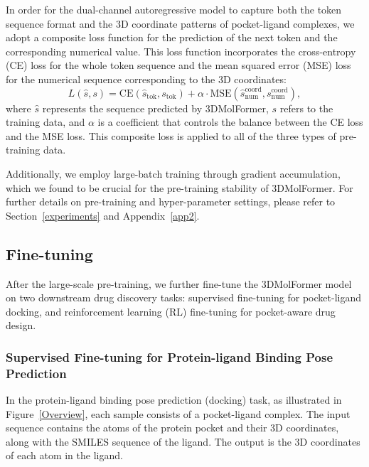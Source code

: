 In order for the dual-channel autoregressive model to capture both the token sequence format and the 3D coordinate patterns of pocket-ligand complexes, we adopt a composite loss function for the prediction of the next token and the corresponding numerical value. This loss function incorporates the cross-entropy (CE) loss for the whole token sequence and the mean squared error (MSE) loss for the numerical sequence corresponding to the 3D coordinates:
\begin{equation}
\label{pretrainloss}
L(\hat{s}, s)=\mathrm{CE}(\hat{s}_\mathrm{tok}, s_\mathrm{tok})+\alpha\cdot \mathrm{MSE}(\hat{s}_\mathrm{num}^\mathrm{coord}, s_\mathrm{num}^\mathrm{coord}),
\end{equation}
where $\hat{s}$ represents the sequence predicted by 3DMolFormer, $s$ refers to the training data, and $\alpha$ is a coefficient that controls the balance between the CE loss and the MSE loss. This composite loss is applied to all of the three types of pre-training data.

Additionally, we employ large-batch training \citep{large-batch-training} through gradient accumulation, which we found to be crucial for the pre-training stability of 3DMolFormer. For further details on pre-training and hyper-parameter settings, please refer to Section~\ref{experiments} and Appendix~\ref{app2}.




\subsection{Fine-tuning}
After the large-scale pre-training, we further fine-tune the 3DMolFormer model on two downstream drug discovery tasks: supervised fine-tuning for pocket-ligand docking, and reinforcement learning (RL) fine-tuning for pocket-aware drug design.

\subsubsection{Supervised Fine-tuning for Protein-ligand Binding Pose Prediction}
In the protein-ligand binding pose prediction (docking) task, as illustrated in Figure~\ref{Overview}, each sample consists of a pocket-ligand complex. The input sequence contains the atoms of the protein pocket and their 3D coordinates, along with the SMILES sequence of the ligand. The output is the 3D coordinates of each atom in the ligand.

